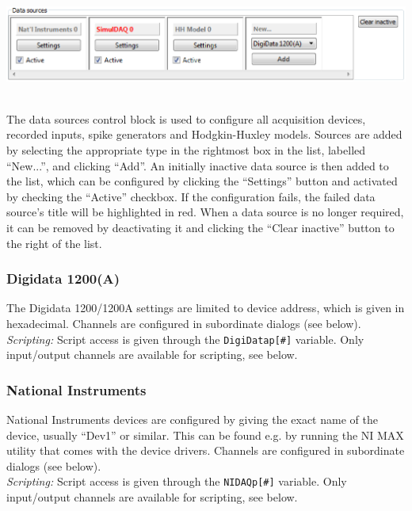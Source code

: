 \documentclass{article}
\begin{document}
\noindent
\parbox{\textwidth}{
	\includegraphics[scale=0.5]{datasources}
} \\[0.2cm]

The data sources control block is used to configure all acquisition devices,
recorded inputs, spike generators and Hodgkin-Huxley models. Sources are added
by selecting the appropriate type in the rightmost box in the list, labelled
``New...'', and clicking ``Add''. An initially inactive data source is then added
to the list, which can be configured by clicking the ``Settings'' button and
activated by checking the ``Active'' checkbox. If the configuration fails, the
failed data source's title will be highlighted in red. When a data source is no
longer required, it can be removed by deactivating it and clicking the
``Clear inactive'' button to the right of the list.

\subsubsection{Digidata 1200(A)}
The Digidata 1200/1200A settings are limited to device address, which is given
in hexadecimal. Channels are configured in subordinate dialogs (see below).
\\
\emph{Scripting:} Script access is given through the \texttt{DigiDatap[\#]} variable.
Only input/output channels are available for scripting, see below.

\subsubsection{National Instruments}
National Instruments devices are configured by giving the exact name of the device,
usually ``Dev1'' or similar. This can be found e.g. by running the NI MAX utility
that comes with the device drivers. Channels are configured in subordinate dialogs (see below).
\\
\emph{Scripting:} Script access is given through the \texttt{NIDAQp[\#]} variable.
Only input/output channels are available for scripting, see below.
\end{document}
